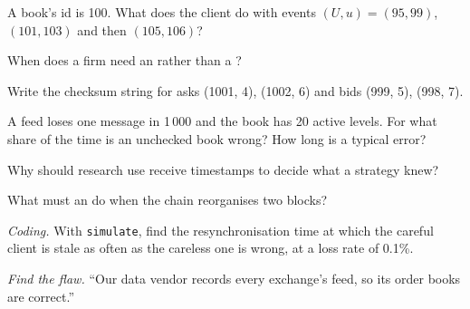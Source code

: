 \begin{exercise}[$\star$]\label{exo:m3:crypto-data-and-infrastructure:1}
A book's id is 100. What does the client do with events $(U, u) = (95, 99)$, $(101, 103)$ and then $(105, 106)$?
\end{exercise}

\begin{exercise}[$\star$]\label{exo:m3:crypto-data-and-infrastructure:2}
When does a firm need an  rather than a ?
\end{exercise}

\begin{exercise}[$\star$]\label{exo:m3:crypto-data-and-infrastructure:3}
Write the checksum string for asks (1001, 4), (1002, 6) and bids (999, 5), (998, 7).
\end{exercise}

\begin{exercise}[$\star\star$]\label{exo:m3:crypto-data-and-infrastructure:4}
A feed loses one message in 1\,000 and the book has 20 active levels. For what share of the time is an unchecked book wrong? How long is a typical error?
\end{exercise}

\begin{exercise}[$\star\star$]\label{exo:m3:crypto-data-and-infrastructure:5}
Why should research use receive timestamps to decide what a strategy knew?
\end{exercise}

\begin{exercise}[$\star\star$]\label{exo:m3:crypto-data-and-infrastructure:6}
What must an  do when the chain reorganises two blocks?
\end{exercise}

\begin{exercise}[$\star\star\star$]\label{exo:m3:crypto-data-and-infrastructure:7}
\emph{Coding.} With \texttt{simulate}, find the resynchronisation time at which the careful client is stale as often as the careless one is wrong, at a loss rate of
0.1\%.
\end{exercise}

\begin{exercise}[$\star\star\star$]\label{exo:m3:crypto-data-and-infrastructure:8}
\emph{Find the flaw.} ``Our data vendor records every exchange's feed, so its order books are correct.''
\end{exercise}

